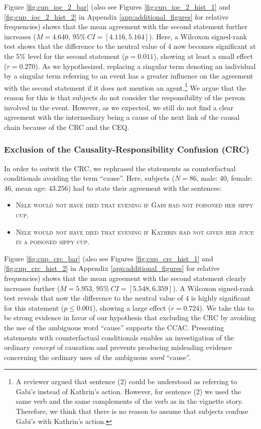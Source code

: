 \documentclass[egregdoesnotlikesansseriftitles,12pt]{scrartcl}
\begin{document}
\noindent Figure \ref{fig:cup_ioc_2_bar} (also see Figures \ref{fig:cup_ioc_2_hist_1} and \ref{fig:cup_ioc_2_hist_2} in Appendix \ref{app:additional_figures} for relative frequencies) shows that the mean agreement with the second statement further increases ($M=4.640$, $95\%~CI=[4.116,5.164]$). Here, a Wilcoxon signed-rank test shows that the difference to the neutral value of $4$ now becomes significant at the 5\% level for the second statement ($p=0.011$), showing at least a small effect ($r=0.270$). As we hypothesized, replacing a singular term denoting an individual by a singular term referring to an event has a greater influence on the agreement with the second statement if it does not mention an agent.\footnote{A reviewer argued that sentence (2) could be understood as referring to Gabi's instead of Kathrin's action. However, for sentence (2) we used the same verb and the same complements of the verb as in the vignette story. Therefore, we think that there is no reason to assume that subjects confuse Gabi's with Kathrin's action.} We argue that the reason for this is that subjects do not consider the responsibility of the person involved in the event. However, as we expected, we still do not find a clear agreement with the intermediary being a cause of the next link of the causal chain because of the CRC and the CEQ.

\subsubsection{Exclusion of the Causality-Responsibility Confusion (CRC)}\label{sec:results_cup_crc}
In order to outwit the CRC, we rephrased the statements as counterfactual conditionals avoiding the term ``cause''. Here, subjects ($N=86$, male: $40$, female: $46$, mean age: $43.256$) had to state their agreement with the sentences:

\begin{itemize}
   \item[(1)]\textsc{Nele would not have died that evening if Gabi had not poisoned her sippy cup.}
   \item[(2)]\textsc{Nele would not have died that evening if Kathrin had not given her juice in a poisoned sippy cup.}
\end{itemize}

\noindent Figure \ref{fig:cup_crc_bar} (also see Figures \ref{fig:cup_crc_hist_1} and \ref{fig:cup_crc_hist_2} in Appendix \ref{app:additional_figures} for relative frequencies) shows that the mean agreement with the second statement clearly increases further ($M=5.953$, $95\%~CI=[5.548,6.359]$). A Wilcoxon signed-rank test reveals that now the difference to the neutral value of $4$ is highly significant for this statement ($p \leq 0.001$), showing a large effect ($r=0.724$). We take this to be strong evidence in favor of our hypothesis that excluding the CRC by avoiding the use of the ambiguous word ``cause'' supports the CCAC. Presenting statements with counterfactual conditionals enables an investigation of the ordinary \textit{concept} of causation and prevents producing misleading evidence concerning the ordinary uses of the ambiguous \textit{word} ``cause''.
\end{document}
